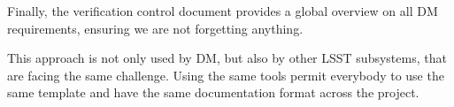 Finally, the verification control document provides a global overview on all DM requirements, ensuring we are not forgetting anything.

This approach is not only used by DM, but also by other LSST subsystems, that are facing the same challenge.
Using the same tools permit everybody to use the same template and have the same documentation format across the project.



